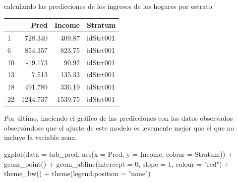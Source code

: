 \documentclass[
  12pt,
]{book}
\newenvironment{Shaded}{\begin{snugshade}}{\end{snugshade}}
\newcommand{\AttributeTok}[1]{\textcolor[rgb]{0.77,0.63,0.00}{#1}}
\newcommand{\DecValTok}[1]{\textcolor[rgb]{0.00,0.00,0.81}{#1}}
\newcommand{\FunctionTok}[1]{\textcolor[rgb]{0.00,0.00,0.00}{#1}}
\newcommand{\NormalTok}[1]{#1}
\newcommand{\OtherTok}[1]{\textcolor[rgb]{0.56,0.35,0.01}{#1}}
\newcommand{\SpecialCharTok}[1]{\textcolor[rgb]{0.00,0.00,0.00}{#1}}
\newcommand{\StringTok}[1]{\textcolor[rgb]{0.31,0.60,0.02}{#1}}
\begin{document}
calculando las predicciones de los ingresos de los hogares por estrato:

\begin{Shaded}
\end{Shaded}

\begin{tabular}{l|r|r|l}
\hline
  & Pred & Income & Stratum\\
\hline
1 & 728.340 & 409.87 & idStrt001\\
\hline
6 & 854.357 & 823.75 & idStrt001\\
\hline
10 & -19.173 & 90.92 & idStrt001\\
\hline
13 & 7.513 & 135.33 & idStrt001\\
\hline
18 & 491.789 & 336.19 & idStrt001\\
\hline
22 & 1244.737 & 1539.75 & idStrt001\\
\hline
\end{tabular}

Por último, haciendo el gráfico de las predicciones con los datos observados observándose que el ajuste de este modelo es levemente mejor que el que no incluye la variable zona.

\begin{Shaded}
\begin{Highlighting}[]
\FunctionTok{ggplot}\NormalTok{(}\AttributeTok{data =}\NormalTok{ tab\_pred, }\FunctionTok{aes}\NormalTok{(}\AttributeTok{x =}\NormalTok{ Pred, }\AttributeTok{y =}\NormalTok{ Income, }\AttributeTok{colour =}\NormalTok{ Stratum)) }\SpecialCharTok{+} 
  \FunctionTok{geom\_point}\NormalTok{() }\SpecialCharTok{+} \FunctionTok{geom\_abline}\NormalTok{(}\AttributeTok{intercept =} \DecValTok{0}\NormalTok{, }\AttributeTok{slope =} \DecValTok{1}\NormalTok{, }\AttributeTok{colour =} \StringTok{"red"}\NormalTok{) }\SpecialCharTok{+}
  \FunctionTok{theme\_bw}\NormalTok{() }\SpecialCharTok{+} \FunctionTok{theme}\NormalTok{(}\AttributeTok{legend.position =} \StringTok{"none"}\NormalTok{) }
\end{Highlighting}
\end{Shaded}
\end{document}
